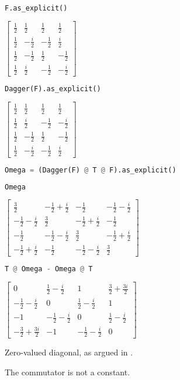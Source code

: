 \begin{lstlisting}[language=Python]
F.as_explicit()
\end{lstlisting}

\(\displaystyle \left[\begin{matrix}\frac{1}{2} & \frac{1}{2} & \frac{1}{2} & \frac{1}{2}\\\frac{1}{2} & - \frac{i}{2} & - \frac{1}{2} & \frac{i}{2}\\\frac{1}{2} & - \frac{1}{2} & \frac{1}{2} & - \frac{1}{2}\\\frac{1}{2} & \frac{i}{2} & - \frac{1}{2} & - \frac{i}{2}\end{matrix}\right]\)

\begin{lstlisting}[language=Python]
Dagger(F).as_explicit()
\end{lstlisting}

\(\displaystyle \left[\begin{matrix}\frac{1}{2} & \frac{1}{2} & \frac{1}{2} & \frac{1}{2}\\\frac{1}{2} & \frac{i}{2} & - \frac{1}{2} & - \frac{i}{2}\\\frac{1}{2} & - \frac{1}{2} & \frac{1}{2} & - \frac{1}{2}\\\frac{1}{2} & - \frac{i}{2} & - \frac{1}{2} & \frac{i}{2}\end{matrix}\right]\)

\begin{lstlisting}[language=Python]
Omega = (Dagger(F) @ T @ F).as_explicit()
\end{lstlisting}

\begin{lstlisting}[language=Python]
Omega
\end{lstlisting}

\(\displaystyle \left[\begin{matrix}\frac{3}{2} & - \frac{1}{2} + \frac{i}{2} & - \frac{1}{2} & - \frac{1}{2} - \frac{i}{2}\\- \frac{1}{2} - \frac{i}{2} & \frac{3}{2} & - \frac{1}{2} + \frac{i}{2} & - \frac{1}{2}\\- \frac{1}{2} & - \frac{1}{2} - \frac{i}{2} & \frac{3}{2} & - \frac{1}{2} + \frac{i}{2}\\- \frac{1}{2} + \frac{i}{2} & - \frac{1}{2} & - \frac{1}{2} - \frac{i}{2} & \frac{3}{2}\end{matrix}\right]\)

\begin{lstlisting}[language=Python]
T @ Omega - Omega @ T
\end{lstlisting}

\(\displaystyle \left[\begin{matrix}0 & \frac{1}{2} - \frac{i}{2} & 1 & \frac{3}{2} + \frac{3 i}{2}\\- \frac{1}{2} - \frac{i}{2} & 0 & \frac{1}{2} - \frac{i}{2} & 1\\-1 & - \frac{1}{2} - \frac{i}{2} & 0 & \frac{1}{2} - \frac{i}{2}\\- \frac{3}{2} + \frac{3 i}{2} & -1 & - \frac{1}{2} - \frac{i}{2} & 0\end{matrix}\right]\)

Zero-valued diagonal, as argued in \cite{Weyl:FiniteComm}.

The commutator is not a constant.
